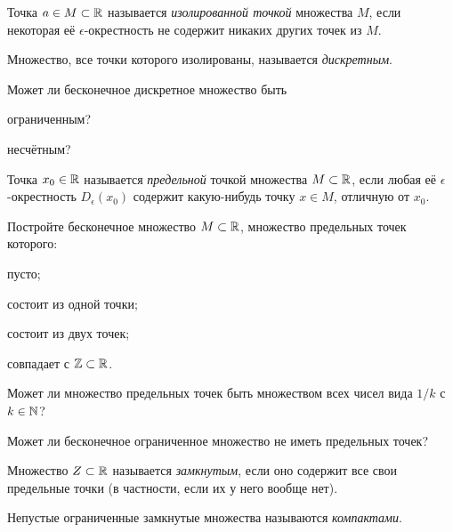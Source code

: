 \documentclass[a4paper, 12pt, num=27]{listok}
\begin{document}
\begin{definition}
	Точка $a \in M \subset \mathbb{R}$ называется \textit{изолированной точкой} множества $M$,
	если некоторая её $\epsilon$-окрестность не содержит никаких других точек из $M$.
\end{definition}
\begin{definition}
	Множество, все точки которого изолированы, называется \textit{дискретным}.
\end{definition}
\begin{problem}
	Может ли бесконечное дискретное множество быть
	\begin{probparts}
		\item ограниченным?
		\item несчётным?
	\end{probparts}
\end{problem}
\begin{definition}
	Точка $x_0 \in \mathbb{R}$ называется \textit{предельной} точкой множества $M \subset \mathbb{R}$,
	если любая её $\epsilon$-окрестность $D_{\epsilon}(x_0)$ содержит какую-нибудь точку $x \in M$, отличную от $x_0$.
\end{definition}
\begin{problem}
	Постройте бесконечное множество $M \subset \mathbb{R}$, множество предельных точек которого:
	\begin{probparts}
		\item пусто;
		\item состоит из одной точки;
		\item состоит из двух точек;
		\item совпадает с $\mathbb{Z} \subset \mathbb{R}$.
	\end{probparts}
\end{problem}
\begin{problem}
	Может ли множество предельных точек быть множеством всех чисел вида $1/k$ с $k\in\mathbb{N}$?
\end{problem}
\begin{problem}
	Может ли бесконечное ограниченное множество не иметь предельных точек?
\end{problem}
\begin{definition}
	Множество $Z \subset \mathbb{R}$ называется \textit{замкнутым}, если оно содержит все свои предельные точки (в частности, если их у него вообще нет).
\end{definition}
\begin{definition}
	Непустые ограниченные замкнутые множества называются \textit{компактами}.
\end{definition}
\end{document}
